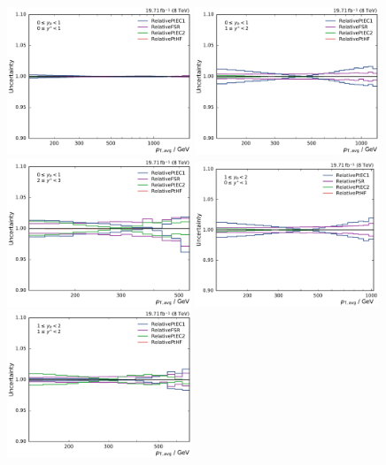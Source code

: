 \begin{figure}[htbp]
    \centering
    \includegraphics[width=0.49\textwidth]{figures/measurement/jec_relunc_3_yb0ys0.pdf}\hfill
    \includegraphics[width=0.49\textwidth]{figures/measurement/jec_relunc_3_yb0ys1.pdf}
    \includegraphics[width=0.49\textwidth]{figures/measurement/jec_relunc_3_yb0ys2.pdf}\hfill
    \includegraphics[width=0.49\textwidth]{figures/measurement/jec_relunc_3_yb1ys0.pdf}
    \includegraphics[width=0.49\textwidth]{figures/measurement/jec_relunc_3_yb1ys1.pdf}\hfill

\end{figure}
